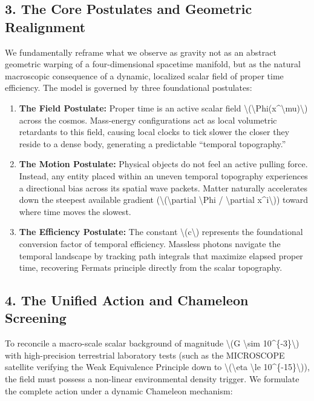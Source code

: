 \documentclass[
  10pt,
]{article}
\providecommand{\tightlist}{%
  \setlength{\itemsep}{0pt}\setlength{\parskip}{0pt}}
\begin{document}
\hypertarget{the-core-postulates-and-geometric-realignment}{%
\subsection{3. The Core Postulates and Geometric
Realignment}\label{the-core-postulates-and-geometric-realignment}}

We fundamentally reframe what we observe as gravity not as an abstract
geometric warping of a four-dimensional spacetime manifold, but as the
natural macroscopic consequence of a dynamic, localized scalar field of
proper time efficiency. The model is governed by three foundational
postulates:

\begin{enumerate}
\tightlist
\item
  \textbf{The Field Postulate:} Proper time is an active scalar field
  \textbackslash(\textbackslash Phi(x\^{}\textbackslash mu)\textbackslash)
  across the cosmos. Mass-energy configurations act as local volumetric
  retardants to this field, causing local clocks to tick slower the
  closer they reside to a dense body, generating a predictable
  ``temporal topography.''
\item
  \textbf{The Motion Postulate:} Physical objects do not feel an active
  pulling force. Instead, any entity placed within an uneven temporal
  topography experiences a directional bias across its spatial wave
  packets. Matter naturally accelerates down the steepest available
  gradient (\textbackslash(\textbackslash partial \textbackslash Phi /
  \textbackslash partial x\^{}i\textbackslash)) toward where time moves
  the slowest.
\item
  \textbf{The Efficiency Postulate:} The constant
  \textbackslash(c\textbackslash) represents the foundational conversion
  factor of temporal efficiency. Massless photons navigate the temporal
  landscape by tracking path integrals that maximize elapsed proper
  time, recovering Fermat\textquotesingle s principle directly from the
  scalar topography.
\end{enumerate}

\hypertarget{the-unified-action-and-chameleon-screening}{%
\subsection{4. The Unified Action and Chameleon
Screening}\label{the-unified-action-and-chameleon-screening}}

To reconcile a macro-scale scalar background of magnitude
\textbackslash(G \textbackslash sim 10\^{}\{-3\}\textbackslash) with
high-precision terrestrial laboratory tests (such as the MICROSCOPE
satellite verifying the Weak Equivalence Principle down to
\textbackslash(\textbackslash eta \textbackslash le
10\^{}\{-15\}\textbackslash)), the field must possess a non-linear
environmental density trigger. We formulate the complete action under a
dynamic Chameleon mechanism:
\end{document}
